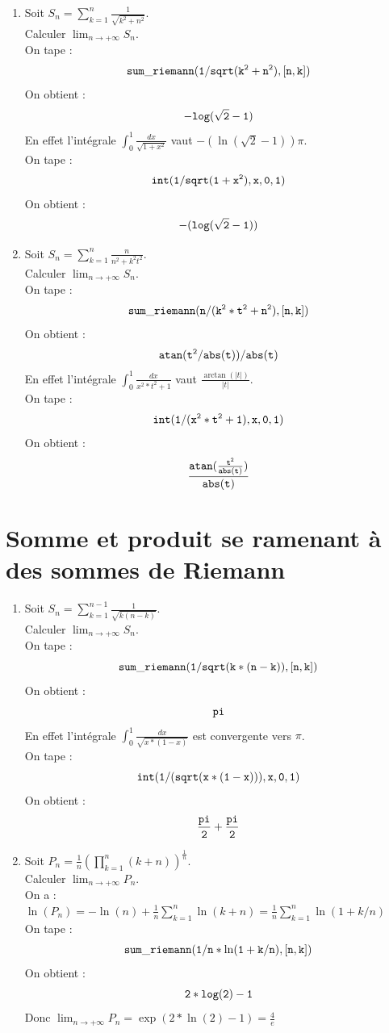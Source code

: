 \documentclass[a4paper,11pt]{book}
\begin{document}
\begin{enumerate}
somme de Riemann de cette int\'egrale.\\
 On tape :
$${\tt int(1/(2+cos(pi*x)),x,0,1)}$$
On obtient :
$${\tt 0}$$
 On tape :
$${\tt limit(n*sin(pi/n),n=+infinity)}$$
On obtient :
$${\tt pi}$$
La limite de $S_n$ est donc $0$ ($0*\pi=0$) quand $n \rightarrow +\infty$.
\item
Soit $\displaystyle S_n=\sum_{k=1}^n \frac{1}{\sqrt{k^2+n^2}}$.\\
Calculer $\displaystyle \lim_{n \rightarrow +\infty} S_n$.\\
On tape :
$${\tt sum\_riemann(1/sqrt(k^2+n^2),[n,k])}$$
On obtient :
$${\tt -log(\sqrt2-1)}$$
En effet l'int\'egrale $\displaystyle \int_0^1 \frac{dx}{\sqrt{1+x^2}}$ vaut 
$-(\ln(\sqrt 2-1))\pi$.\\
 On tape :
$${\tt int(1/sqrt(1+x^2),x,0,1)}$$
On obtient :
$${\tt -(log(\sqrt2-1))}$$
\item
Soit $\displaystyle S_n=\sum_{k=1}^n \frac{n}{n^2+k^2t^2}$.\\
Calculer $\displaystyle \lim_{n \rightarrow +\infty} S_n$.\\
On tape :
$${\tt sum\_riemann(n/(k^2*t^2+n^2),[n,k])}$$
On obtient :
$${\tt atan(t^2/abs(t))/abs(t)}$$
En effet l'int\'egrale $\displaystyle \int_0^1 \frac{dx}{x^2*t^2+1}$ vaut
 $\displaystyle\frac{\arctan(|t|)}{|t|}$.\\
 On tape :
$${\tt int(1/(x^2*t^2+1),x,0,1)}$$
On obtient :
$${\tt \frac{atan(\frac{t^2}{abs(t)})}{abs(t)}}$$

\end{enumerate}
\section{Somme et produit se ramenant \`a des sommes de Riemann}
\begin{enumerate} 
\item
Soit $\displaystyle S_n=\sum_{k=1}^{n-1} \frac{1}{\sqrt{k(n-k)}}$.\\
Calculer $\displaystyle \lim_{n \rightarrow +\infty} S_n$.\\
On tape :
$${\tt sum\_riemann(1/sqrt(k*(n-k)),[n,k])}$$
On obtient :
$${\tt pi}$$
En effet l'int\'egrale $\displaystyle \int_0^1 \frac{dx}{\sqrt{x*(1-x)}}$ est 
convergente vers $\pi$. \\
On tape :
$${\tt int(1/(sqrt(x*(1-x))),x,0,1)}$$
On obtient :
$${\tt \frac{pi}{2}+\frac{pi}{2}}$$
\item
Soit $\displaystyle P_n=\frac{1}{n}(\prod_{k=1}^n (k+n))^{\frac{1}{n}}$.\\
Calculer $\displaystyle \lim_{n \rightarrow +\infty} P_n$.\\
On a :\\
$\ln(P_n)=-\ln(n)+\frac{1}{n}\sum_{k=1}^n\ln(k+n)=\frac{1}{n}\sum_{k=1}^n\ln(1+k/n)$\\
On tape :
$${\tt sum\_riemann(1/n*\ln(1+k/n),[n,k])}$$
On obtient :
$${\tt 2*log(2)-1}$$
Donc $\displaystyle \lim_{n \rightarrow +\infty} P_n=\exp(2*\ln(2)-1)=\frac{4}{e}$
\end{enumerate}
\end{document}
